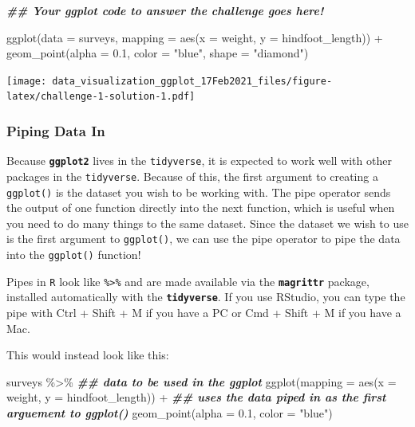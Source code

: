\documentclass[
]{article}
\newenvironment{Shaded}{\begin{snugshade}}{\end{snugshade}}
\newcommand{\AttributeTok}[1]{\textcolor[rgb]{0.77,0.63,0.00}{#1}}
\newcommand{\DocumentationTok}[1]{\textcolor[rgb]{0.56,0.35,0.01}{\textbf{\textit{#1}}}}
\newcommand{\FloatTok}[1]{\textcolor[rgb]{0.00,0.00,0.81}{#1}}
\newcommand{\FunctionTok}[1]{\textcolor[rgb]{0.00,0.00,0.00}{#1}}
\newcommand{\NormalTok}[1]{#1}
\newcommand{\SpecialCharTok}[1]{\textcolor[rgb]{0.00,0.00,0.00}{#1}}
\newcommand{\StringTok}[1]{\textcolor[rgb]{0.31,0.60,0.02}{#1}}
\begin{document}
\begin{Shaded}
\begin{Highlighting}[]
\DocumentationTok{\#\# Your ggplot code to answer the challenge goes here!}
\end{Highlighting}
\end{Shaded}

\newpage

\begin{Shaded}
\begin{Highlighting}[]
\FunctionTok{ggplot}\NormalTok{(}\AttributeTok{data =}\NormalTok{ surveys, }
       \AttributeTok{mapping =} \FunctionTok{aes}\NormalTok{(}\AttributeTok{x =}\NormalTok{ weight, }\AttributeTok{y =}\NormalTok{ hindfoot\_length)) }\SpecialCharTok{+}
  \FunctionTok{geom\_point}\NormalTok{(}\AttributeTok{alpha =} \FloatTok{0.1}\NormalTok{, }\AttributeTok{color =} \StringTok{"blue"}\NormalTok{, }\AttributeTok{shape =} \StringTok{"diamond"}\NormalTok{)}
\end{Highlighting}
\end{Shaded}

\texttt{[image: data\_visualization\_ggplot\_17Feb2021\_files/figure-latex/challenge-1-solution-1.pdf]}

\hypertarget{piping-data-in}{%
\subsubsection{Piping Data In}\label{piping-data-in}}

Because \textbf{\texttt{ggplot2}} lives in the \texttt{tidyverse}, it is
expected to work well with other packages in the \texttt{tidyverse}.
Because of this, the first argument to creating a \texttt{ggplot()} is
the dataset you wish to be working with. The pipe operator sends the
output of one function directly into the next function, which is useful
when you need to do many things to the same dataset. Since the dataset
we wish to use is the first argument to \texttt{ggplot()}, we can use
the pipe operator to pipe the data into the \texttt{ggplot()} function!

Pipes in \texttt{R} look like \texttt{\%\textgreater{}\%} and are made
available via the \textbf{\texttt{magrittr}} package, installed
automatically with the \textbf{\texttt{tidyverse}}. If you use RStudio,
you can type the pipe with Ctrl + Shift + M if you have a PC or Cmd +
Shift + M if you have a Mac.

This would instead look like this:

\begin{Shaded}
\begin{Highlighting}[]
\NormalTok{surveys }\SpecialCharTok{\%\textgreater{}\%}  
  \DocumentationTok{\#\# data to be used in the ggplot  }
  \FunctionTok{ggplot}\NormalTok{(}\AttributeTok{mapping =} \FunctionTok{aes}\NormalTok{(}\AttributeTok{x =}\NormalTok{ weight, }\AttributeTok{y =}\NormalTok{ hindfoot\_length)) }\SpecialCharTok{+} 
  \DocumentationTok{\#\# uses the data piped in as the first arguement to ggplot() }
  \FunctionTok{geom\_point}\NormalTok{(}\AttributeTok{alpha =} \FloatTok{0.1}\NormalTok{, }\AttributeTok{color =} \StringTok{"blue"}\NormalTok{)}
\end{Highlighting}
\end{Shaded}
\end{document}
